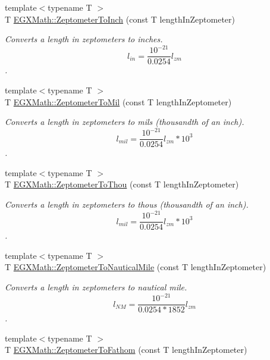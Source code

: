 \begin{DoxyCompactItemize}
{\footnotesize template$<$typename T $>$ }\\T \mbox{\hyperlink{group___e_g_x_math-_conversions-_length_conversions-_s_i-_zeptometer-_imperial_ga6bd6b3ee6932c6aa40442a9bff2580cb}{E\+G\+X\+Math\+::\+Zeptometer\+To\+Inch}} (const T length\+In\+Zeptometer)
\begin{DoxyCompactList}\small\item\em Converts a length in zeptometers to inches. \[ l_{in}= \frac{10^{-21}}{0.0254} l_{zm} \]. \end{DoxyCompactList}\item 
{\footnotesize template$<$typename T $>$ }\\T \mbox{\hyperlink{group___e_g_x_math-_conversions-_length_conversions-_s_i-_zeptometer-_imperial_ga68abfac4247069bdffc24002b0636495}{E\+G\+X\+Math\+::\+Zeptometer\+To\+Mil}} (const T length\+In\+Zeptometer)
\begin{DoxyCompactList}\small\item\em Converts a length in zeptometers to mils (thousandth of an inch). \[ l_{mil}= \frac{10^{-21}}{0.0254} l_{zm} * 10^{3} \]. \end{DoxyCompactList}\item 
{\footnotesize template$<$typename T $>$ }\\T \mbox{\hyperlink{group___e_g_x_math-_conversions-_length_conversions-_s_i-_zeptometer-_imperial_ga14432ed712e073dcae040496f83464b6}{E\+G\+X\+Math\+::\+Zeptometer\+To\+Thou}} (const T length\+In\+Zeptometer)
\begin{DoxyCompactList}\small\item\em Converts a length in zeptometers to thous (thousandth of an inch). \[ l_{mil}= \frac{10^{-21}}{0.0254} l_{zm} * 10^{3} \]. \end{DoxyCompactList}\item 
{\footnotesize template$<$typename T $>$ }\\T \mbox{\hyperlink{group___e_g_x_math-_conversions-_length_conversions-_s_i-_zeptometer-_nautical_ga9d6a1de6b4a8de39ba16da0a17cdca42}{E\+G\+X\+Math\+::\+Zeptometer\+To\+Nautical\+Mile}} (const T length\+In\+Zeptometer)
\begin{DoxyCompactList}\small\item\em Converts a length in zeptometers to nautical mile. \[ l_{NM}= \frac{10^{-21}}{0.0254 * 1852} l_{zm} \]. \end{DoxyCompactList}\item 
{\footnotesize template$<$typename T $>$ }\\T \mbox{\hyperlink{group___e_g_x_math-_conversions-_length_conversions-_s_i-_zeptometer-_nautical_ga338ca94378cf11aca399ecdfc859950a}{E\+G\+X\+Math\+::\+Zeptometer\+To\+Fathom}} (const T length\+In\+Zeptometer)

\end{DoxyCompactItemize}
